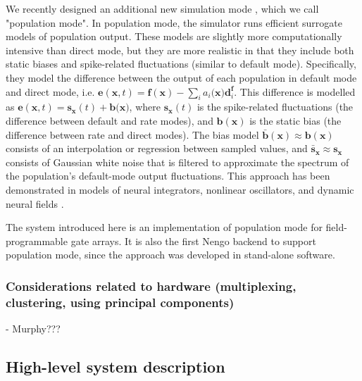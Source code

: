 \documentclass[english]{article}
\begin{document}
We recently designed an additional new simulation mode \cite{Tripp2015}, which we call "population mode". In population mode, the simulator runs efficient surrogate models of population output. These models are slightly more computationally intensive than direct mode, but they are more realistic in that they include both static biases and spike-related fluctuations (similar to default mode). Specifically, they model the difference between the output of each population in default mode and direct mode, i.e. $\mathbf{e}(\mathbf{x},t)=\mathbf{f}(\mathbf{x})-\sum_{i}a_{i}(\mathbf{x)}\mathbf{d}_{i}^{\mathbf{f}}$. This difference is modelled as $\mathbf{e}(\mathbf{x},t)=\mathbf{s}_{\mathbf{x}}(t) + \mathbf{b}({\mathbf{x})}$, where $\mathbf{s}_{\mathbf{x}}(t)$ is the spike-related fluctuations (the difference between default and rate modes), and $\mathbf{b}(\mathbf{x})$ is the static bias (the difference between rate and direct modes). The bias model $\bar{\mathbf{b}}(\mathbf{x}) \approx \mathbf{b}(\mathbf{x})$ consists of an interpolation or regression between sampled values, and $\bar{\mathbf{s}}_{\mathbf{x}} \approx \mathbf{s}_{\mathbf{x}}$ consists of Gaussian white noise that is filtered to approximate the spectrum of the population's default-mode output fluctuations. This approach has been demonstrated in models of neural integrators, nonlinear oscillators, and dynamic neural fields \cite{Tripp2015}. 

The system introduced here is an implementation of population mode for field-programmable gate arrays. It is also the first Nengo backend to support population mode, since the approach was developed in stand-alone software. 

\subsubsection{Considerations related to hardware (multiplexing, clustering, using principal components)}

- Murphy???


\subsection{High-level system description}
\end{document}
